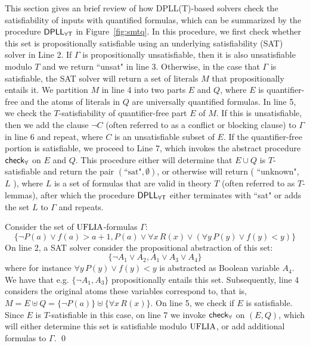 \documentclass[oribibl]{llncs}
\begin{document}
This section gives an brief review of how DPLL(T)-based solvers check the satisfiability of
inputs with quantified formulas, which can be summarized by the procedure $\small\mathsf{DPLL_{\forall T}}$ in Figure~\ref{fig:smtq}.
In this procedure, we first check whether this set is propositionally satisfiable using
an underlying satisfiability (SAT) solver in Line 2.
If $\Gamma$ is propositionally unsatisfiable,
then it is also unsatisfiable modulo $T$ and we return ``unsat" in line 3.
Otherwise, in the case that $\Gamma$ is satisfiable, the SAT solver will return a set of literals $M$ that propositionally entails it.
We partition $M$ in line 4 into two parts $E$ and $Q$,
where $E$ is quantifier-free and the atoms of literals in $Q$ are universally quantified formulas.
In line 5, we check the $T$-satisfiability of quantifier-free part $E$ of $M$.
If this is unsatisfiable, then we add the clause $\neg C$ (often referred to as a conflict or blocking clause) to $\Gamma$ in line 6 and repeat,
where $C$ is an unsatisfiable subset of $E$.
If the quantifier-free portion is satisfiable,
we proceed to Line 7, which invokes the abstract procedure $\small\mathsf{check}_\forall$ on $E$ and $Q$.
This procedure either will determine that $E \cup Q$ is $T$-satisfiable and return the pair $( \text{``sat"}, \emptyset )$,
or otherwise will return ( ``unknown", $L$ ), where $L$ is a set of formulas that are valid in theory $T$ (often referred to as $T$-lemmas),
after which the procedure $\small\mathsf{DPLL_{\forall T}}$ either terminates with ``sat" or adds the set $L$ to $\Gamma$ and repeats.
\begin{example}
Consider the set of $\mathrm{UFLIA}$-formulas $\Gamma$:
\[
\{ \neg P(a) \vee f(a)>a+1, P( a ) \vee \forall x\, R( x ) \vee (\forall y\, P(y) \vee f( y ) < y) \}
\]
On line 2, a SAT solver consider the propositional abstraction of this set:
\[
\{ \neg A_1 \vee A_2, A_1 \vee A_3 \vee A_4 \}
\]
where for instance $\forall y\, P(y) \vee f( y ) < y$ is abstracted as Boolean variable $A_4$.
We have that e.g. $\{ \neg A_1, A_3 \}$ propositionally entails this set.
Subsequently, line 4 considers the original atoms these variables correspond to, that is,
$M = E \uplus Q = \{ \neg P( a ) \} \uplus \{ \forall x\, R( x ) \}$.
On line 5, we check if $E$ is satisfiable.
Since $E$ is $T$-satisfiable in this case, on line 7
we invoke $\small\mathsf{check}_\forall$ on $(E, Q)$, which will either determine this set is
satisfiable modulo $\mathrm{UFLIA}$, or add additional formulas to $\Gamma$. 
\qed
\end{example}
\end{document}
